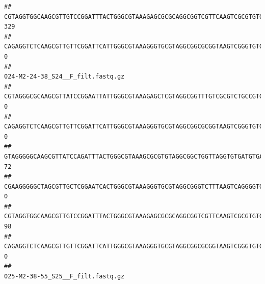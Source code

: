 \documentclass[]{article}
\begin{document}
\begin{verbatim}
## CGTAGGTGGCAAGCGTTGTCCGGATTTACTGGGCGTAAAGAGCGCGCAGGCGGTCGTTCAAGTCGCGTGTGAAAGCCCCCGGCTCAACTGGGGAGGGTCACGCGATACTGATCGACTCGAAGGCAGGAGAGGGTAGTGGAATTCCCGGTGTAGTGGTGAAATGCGTAGATATCGGGAGGAACACCAGTGGCGAAGGCGACTACCTGGCCTGTTCTTGACGCTGAGGCGCGAAAGCTAGGGGAGCAAACG                              329
## CAGAGGTCTCAAGCGTTGTTCGGATTCATTGGGCGTAAAGGGTGCGTAGGCGGCGCGGTAAGTCGGGTGTGAAATCTCGGGGCTTAACTCCGAAACTGCATTCGATACTGCCGTGCTTGAGGACTGGAGAGGAGACTGGAATTTACGGTGTAGCGGTGAAATGCGTAGATATCGTAAGGAAGACCAGTGGCGAAGGCGGGTCTCTGGACAGTTCCTGACGCTGAGGCACGAAGGCCAGGGGAGCAAACG                                0
##                                                                                                                                                                                                                                                           024-M2-24-38_S24__F_filt.fastq.gz
## CGTAGGGCGCAAGCGTTATCCGGAATTATTGGGCGTAAAGAGCTCGTAGGCGGTTTGTCGCGTCTGCCGTGAAAGTCCGGGGCTCAACTCCGGATCTGCGGTGGGTACGGGCAGACTAGAGTGATGTAGGGGAGACTGGAATTCCTGGTGTAGCGGTGAAATGCGCAGATATCAGGAGGAACACCGATGGCGAAGGCAGGTCTCTGGGCATTAACTGACGCTGAGGAGCGAAAGCATGGGGAGCGAACA                                 0
## CAGAGGTCTCAAGCGTTGTTCGGATTCATTGGGCGTAAAGGGTGCGTAGGCGGCGCGGTAAGTCGGGTGTGAAATCTCGGAGCTTAACTCCGAAACTGCATTCGATACTGCCGTGCTTGAGGACTGGAGAGGAGACTGGAATTTACGGTGTAGCGGTGAAATGCGTAGATATCGTAAGGAAGACCAGTGGCGAAGGCGGGTCTCTGGACAGTTCCTGACGCTGAGGCACGAAGGCCAGGGGAGCAAACG                                 0
## GTAGGGGGCAAGCGTTATCCAGATTTACTGGGCGTAAAGCGCGTGTAGGCGGCTGGTTAGGTGTGATGTGAAATCTTCCGGCTCAACCGGAAAACTGCATTGCAAACCGGCCTGGCTAGAGTGCAGGAGAGGGAAGCGGAATTCCAGGTGTAGCGGTGAAATGCGTAGATATCTGGAGGAACACCAGTGGCGAAGGCGGCTTCCTGGCCTGCAACTGACGCTGAGACGCGAAAGCGTGGGGAGCGAAC                                 72
## CGAAGGGGGCTAGCGTTGCTCGGAATCACTGGGCGTAAAGGGTGCGTAGGCGGGTCTTTAAGTCAGGGGTGAAATCCTGGAGCTCAACTCCAGAACTGCCTTTGATACTGAAGATCTTGAGTTCGGGAGAGGTGAGTGGAACTGCGAGTGTAGAGGTGAAATTCGTAGATATTCGCAAGAACACCAGTGGCGAAGGCGGCTCACTGGCCCGATACTGACGCTGAGGCACGAAAGCGTGGGGAGCAAACA                                 0
## CGTAGGTGGCAAGCGTTGTCCGGATTTACTGGGCGTAAAGAGCGCGCAGGCGGTCGTTCAAGTCGCGTGTGAAAGCCCCCGGCTCAACTGGGGAGGGTCACGCGATACTGATCGACTCGAAGGCAGGAGAGGGTAGTGGAATTCCCGGTGTAGTGGTGAAATGCGTAGATATCGGGAGGAACACCAGTGGCGAAGGCGACTACCTGGCCTGTTCTTGACGCTGAGGCGCGAAAGCTAGGGGAGCAAACG                                98
## CAGAGGTCTCAAGCGTTGTTCGGATTCATTGGGCGTAAAGGGTGCGTAGGCGGCGCGGTAAGTCGGGTGTGAAATCTCGGGGCTTAACTCCGAAACTGCATTCGATACTGCCGTGCTTGAGGACTGGAGAGGAGACTGGAATTTACGGTGTAGCGGTGAAATGCGTAGATATCGTAAGGAAGACCAGTGGCGAAGGCGGGTCTCTGGACAGTTCCTGACGCTGAGGCACGAAGGCCAGGGGAGCAAACG                                 0
##                                                                                                                                                                                                                                                           025-M2-38-55_S25__F_filt.fastq.gz

\end{verbatim}
\end{document}
